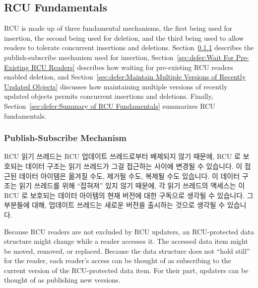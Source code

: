 
\subsection{RCU Fundamentals}
\label{sec:defer:RCU Fundamentals}

RCU is made up of three fundamental mechanisms, the first being
used for insertion, the second being used for deletion, and the third
being used to allow readers to tolerate concurrent insertions and deletions.
Section~\ref{sec:defer:Publish-Subscribe Mechanism}
describes the publish-subscribe mechanism used for insertion,
Section~\ref{sec:defer:Wait For Pre-Existing RCU Readers}
describes how waiting for pre-existing RCU readers enabled deletion,
and
Section~\ref{sec:defer:Maintain Multiple Versions of Recently Updated Objects}
discusses how maintaining multiple versions of recently updated objects
permits concurrent insertions and deletions.
Finally,
Section~\ref{sec:defer:Summary of RCU Fundamentals}
summarizes RCU fundamentals.

\subsubsection{Publish-Subscribe Mechanism}
\label{sec:defer:Publish-Subscribe Mechanism}

RCU 읽기 쓰레드는 RCU 업데이트 쓰레드로부터 배제되지 않기 때문에, RCU 로
보호되는 데이터 구조는 읽기 쓰레드가 그걸 접근하는 사이에 변경될 수 있습니다.
이 접근된 데이터 아이템은 옮겨질 수도, 제거될 수도, 복제될 수도 있습니다.
이 데이터 구조는 읽기 쓰레드를 위해 ``잡혀져'' 있지 않기 때문에, 각 읽기
쓰레드의 액세스는 이 RCU 로 보호되는 데이터 아이템의 현재 버전에 대한 구독으로
생각될 수 있습니다.
그 부분들에 대해, 업데이트 쓰레드는 새로운 버전을 출시하는 것으로 생각될 수
있습니다.

Because RCU readers are not excluded by RCU updaters, an RCU-protected
data structure might change while a reader accesses it.
The accessed data item might be moved, removed, or replaced.
Because the data structure does not ``hold still'' for the reader,
each reader's access can be thought of as subscribing to the current
version of the RCU-protected data item.
For their part, updaters can be thought of as publishing new versions.


